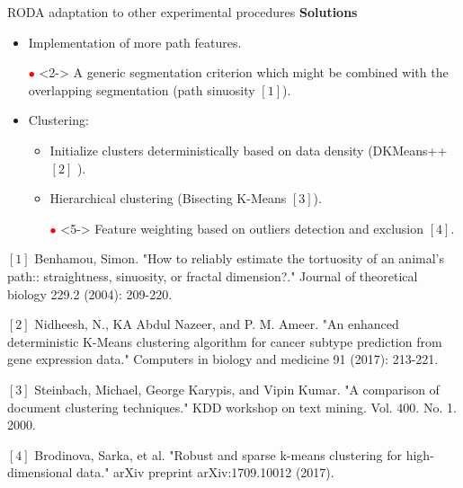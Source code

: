 \documentclass{beamer}
\newlength{\tmpShadow}
\newcommand{\MyShadow}[2]{%
	\settowidth{\tmpShadow}{#1}
	\addtolength{\tmpShadow}{.1em}
	\raisebox{-0.25ex}{\textcolor{gray!70}{#1}}%
	\kern-\tmpShadow%
	\textcolor{#2}{#1}%
}
\newcounter{mycounter}
\newenvironment{noindlist}
{\begin{list}{}{\usecounter{mycounter} \labelsep=0em \labelwidth=0em \leftmargin=0em \itemindent=0em}}
	{\end{list}}
\begin{document}
{\begin{frame}{RODA adaptation to other experimental procedures}
	\textbf{Solutions}	
	\begin{itemize}[label={\MyShadow{$\bullet$}{blue!80}}]
		\item<1-> Implementation of more path features.
		\vspace{3mm}
		\item[\textcolor{red}{$\bullet$}]<2-> A generic segmentation criterion which might be combined with the overlapping segmentation (path sinuosity $[1]$). 
		\vspace{3mm}
		\item<3-> Clustering:
		\vspace{3mm}
		\begin{itemize}[label={\MyShadow{$\bullet$}{blue!80}}]
			\item<3-> Initialize clusters deterministically based on data density (DKMeans++ $[2]$ \textbf{\hyperlink{DKMPP}{\beamerbutton{$\rightarrow$}}}).
			\vspace{3mm}
			\item<4-> Hierarchical clustering (Bisecting K-Means $[3]$).
			\vspace{3mm}
			\item[\textcolor{red}{$\bullet$}]<5-> Feature weighting based on outliers detection and exclusion $[4]$.
			\vspace{3mm}
		\end{itemize}
	\end{itemize}	
	\begin{tiny}
		\begin{noindlist}
			\item<2-> $[1]$ Benhamou, Simon. "How to reliably estimate the tortuosity of an animal's path:: straightness, sinuosity, or fractal dimension?." Journal of theoretical biology 229.2 (2004): 209-220.
			\item<3-> $[2]$ Nidheesh, N., KA Abdul Nazeer, and P. M. Ameer. "An enhanced deterministic K-Means clustering algorithm for cancer subtype prediction from gene expression data." Computers in biology and medicine 91 (2017): 213-221.
			\item<4-> $[3]$ Steinbach, Michael, George Karypis, and Vipin Kumar. "A comparison of document clustering techniques." KDD workshop on text mining. Vol. 400. No. 1. 2000.
			\item<5-> $[4]$ Brodinova, Sarka, et al. "Robust and sparse k-means clustering for high-dimensional data." arXiv preprint arXiv:1709.10012 (2017).
		\end{noindlist}
	\end{tiny}
\end{frame}

}
\end{document}
